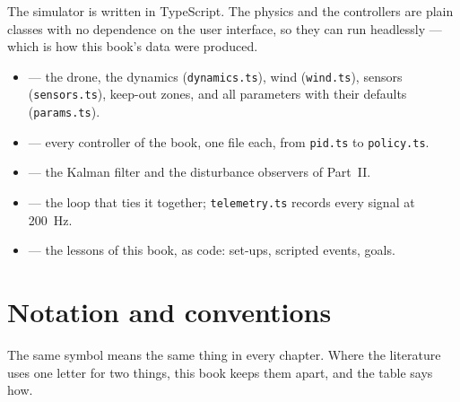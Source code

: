 \begin{inapp}
The simulator is written in TypeScript. The physics and the controllers are plain classes with no dependence on the user interface, so they can run headlessly — which is how this book's data were produced.
\begin{itemize}[leftmargin=1.2em]
  \item {} — the drone, the dynamics (\texttt{dynamics.ts}), wind (\texttt{wind.ts}), sensors (\texttt{sensors.ts}), keep-out zones, and all parameters with their defaults (\texttt{params.ts}).
  \item {} — every controller of the book, one file each, from \texttt{pid.ts} to \texttt{policy.ts}.
  \item {} — the Kalman filter and the disturbance observers of Part~II.
  \item {} — the loop that ties it together; \texttt{telemetry.ts} records every signal at \SI{200}{Hz}.
  \item {} — the lessons of this book, as code: set-ups, scripted events, goals.
\end{itemize}
\end{inapp}

\clearpage
\section*{Notation and conventions}
\label{sec:notation}

The same symbol means the same thing in every chapter. Where the literature uses one letter for two things, this book keeps them apart, and the table says how.

